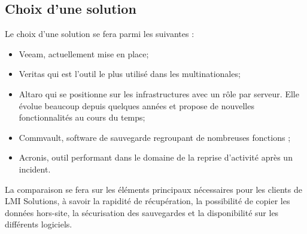\documentclass[pfe]{tnreport} %
\begin{document}
\subsection{Choix d'une solution}

Le choix d'une solution se fera parmi les suivantes : \newline
\begin{itemize}
 \item Veeam, actuellement mise en place; \newline
 \item Veritas qui est l'outil le plus utilisé dans les multinationales; \newline
 \item Altaro qui se positionne sur les infrastructures avec un rôle par serveur. Elle évolue beaucoup depuis quelques années et propose de nouvelles fonctionnalités au cours du temps; \newline
 \item Commvault, software de sauvegarde regroupant de nombreuses fonctions ; \newline 
 \item Acronis, outil performant dans le domaine de la reprise d'activité après un incident. \newline
\end{itemize}

La comparaison se fera sur les éléments principaux nécessaires pour les clients de LMI Solutions, à savoir la rapidité de récupération, la possibilité de copier les données hors-site, la sécurisation des sauvegardes et la disponibilité sur les différents logiciels.
\end{document}

